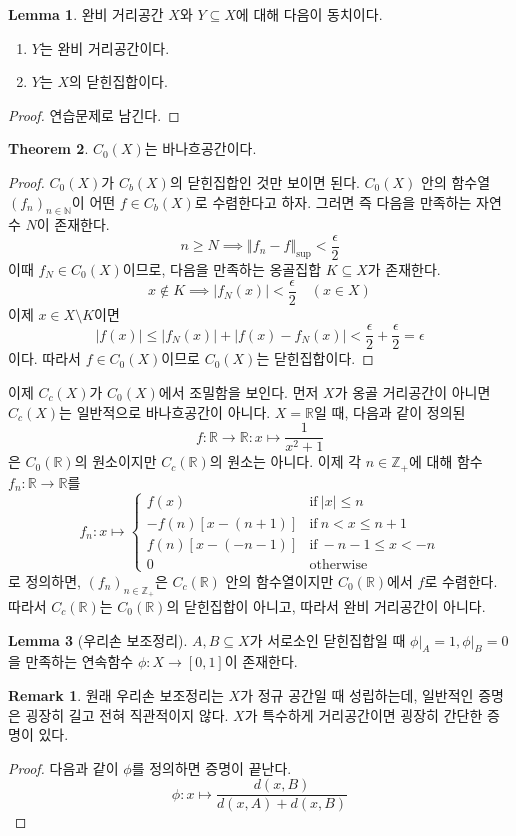 \documentclass[11pt]{book}
\numberwithin{equation}{chapter}
\def\NN{\mathbb{N}}
\def\ZZ{\mathbb{Z}}
\def\RR{\mathbb{R}}
\def\eps{\epsilon}
\newcommand{\abs}[1]{\left\vert#1\right\vert}
\newcommand{\norm}[1]{\left\Vert#1\right\Vert}
\def\textif{\text{if}}
\def\otw{\text{otherwise}}
\theoremstyle{definition}
\newtheorem{thm}{Theorem}[section]
\newtheorem{lem}[thm]{Lemma}
\newtheorem*{rem}{Remark}
\newenvironment{enum}
	{\begin{enumerate}[label=(\alph*), leftmargin=2\parindent]}
	{\end{enumerate}}
\begin{document}
\begin{lem}
    완비 거리공간 \(X\)와 \(Y \subseteq X\)에 대해 다음이 동치이다.
    \begin{enum}
        \item \(Y\)는 완비 거리공간이다.
        \item \(Y\)는 \(X\)의 닫힌집합이다.
    \end{enum}
\end{lem}
\begin{proof}
    연습문제로 남긴다.
\end{proof}

\begin{thm}
    \(C_0(X)\)는 바나흐공간이다.
\end{thm}
\begin{proof}
    \(C_0(X)\)가 \(C_b(X)\)의 닫힌집합인 것만 보이면 된다. \(C_0(X)\) 안의 함수열 \((f_n)_{n \in \NN}\)이 어떤 \(f \in C_b(X)\)로 수렴한다고 하자. 그러면 즉 다음을 만족하는 자연수 \(N\)이 존재한다.
    \[
    n \ge N \implies \norm{f_n - f}_{\sup} < \frac{\eps}{2}    
    \]
    이때 \(f_N \in C_0(X)\)이므로, 다음을 만족하는 옹골집합 \(K \subseteq X\)가 존재한다.
    \[
    x \notin K \implies \abs{f_N(x)} < \frac{\eps}{2} \quad (x \in X)
    \]
    이제 \(x \in X \setminus K\)이면
    \[
    \abs{f(x)} \le \abs{f_N(x)} + \abs{f(x) - f_N(x)} < \frac{\eps}{2} + \frac{\eps}{2} = \eps
    \]
    이다. 따라서 \(f \in C_0(X)\)이므로 \(C_0(X)\)는 닫힌집합이다.
\end{proof}

이제 \(C_c(X)\)가 \(C_0(X)\)에서 조밀함을 보인다. 먼저 \(X\)가 옹골 거리공간이 아니면 \(C_c(X)\)는 일반적으로 바나흐공간이 아니다. \(X = \RR\)일 때, 다음과 같이 정의된
\[
f : \RR \to \RR : x \mapsto \frac{1}{x^2 + 1}    
\] 
은 \(C_0(\RR)\)의 원소이지만 \(C_c(\RR)\)의 원소는 아니다. 이제 각 \(n \in \ZZ_+\)에 대해 함수 \(f_n : \RR \to \RR\)를
\[
f_n : x \mapsto \begin{cases}
    f(x) &\textif \ \abs{x} \le n\\
    -f(n)[x - (n+1)] &\textif \ n < x \le n+1\\
    f(n)[x - (-n-1)] &\textif \ -n-1 \le x < -n\\
    0 &\otw
\end{cases}    
\]
로 정의하면, \((f_n)_{n \in \ZZ_+}\)은 \(C_c(\RR)\) 안의 함수열이지만 \(C_0(\RR)\)에서 \(f\)로 수렴한다. 따라서 \(C_c(\RR)\)는 \(C_0(\RR)\)의 닫힌집합이 아니고, 따라서 완비 거리공간이 아니다.

\begin{lem}[우리손 보조정리]
    \(A, B \subseteq X\)가 서로소인 닫힌집합일 때 \(\phi \vert_A = 1, \phi \vert_B = 0\)을 만족하는 연속함수 \(\phi : X \to [0, 1]\)이 존재한다.
\end{lem}
\begin{rem}
    원래 우리손 보조정리는 \(X\)가 정규 공간일 때 성립하는데, 일반적인 증명은 굉장히 길고 전혀 직관적이지 않다. \(X\)가 특수하게 거리공간이면 굉장히 간단한 증명이 있다.
\end{rem}
\begin{proof}
    다음과 같이 \(\phi\)를 정의하면 증명이 끝난다.
    \[
    \phi : x \mapsto \frac{d(x, B)}{d(x, A) + d(x, B)}    
    \]
\end{proof}
\end{document}
